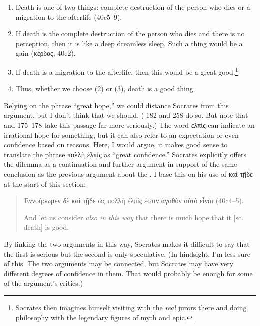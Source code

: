 \documentclass[11pt]{article}
\begin{document}
\begin{enumerate}

    \item Death is one of two things: complete destruction of the person who dies or a migration to the afterlife (40c5--9).

    \item If death is the complete destruction of the person who dies and there is no perception, then it is like a deep dreamless sleep.  Such a thing would be a gain ({\g κέρδος}, 40e2).

    \item If death is a migration to the afterlife, then this would be a great good.\footnote{Socrates then imagines himself visiting with the \emph{real} jurors there and doing philosophy with the legendary figures of myth and epic.}

    \item Thus, whether we choose (2) or (3), death is a good thing.

\end{enumerate}

Relying on the phrase ``great hope,'' we could distance Socrates from this argument, but I don't think that we should. (\citet{reeve1989} 182 and \citet{brickhousesmith1989} 258 do so.  But note that \citet{brickhousesmith1994} and \citet{brickhousesmith2004} 175--178 take this passage far more seriously.)  The word ἐλπίς can indicate an irrational hope for something, but it can also refer to an expectation or even confidence based on reasons.  Here, I would argue, it makes good sense to translate the phrase πολλὴ ἐλπίς as ``great confidence.''  Socrates explicitly offers the dilemma as a continuation and further argument in support of the same conclusion as the previous argument about the .  I base this on his use of {\g καὶ τῇδε} at the start of this section:
\begin{quote}
    {\g
    Ἐννοήσωμεν δὲ καὶ τῇδε ὡς πολλὴ ἐλπίς ἐστιν ἀγαθὸν αὐτὸ εἶναι
    } (40c4--5).

    And let us consider \emph{also in this way} that there is much hope that it [sc. death] is good.
\end{quote}
By linking the two arguments in this way, Socrates makes it difficult to say that the first is serious but the second is only speculative.  (In hindsight, I'm less sure of this.  The two arguments may be connected, but Socrates may have very different degrees of confidence in them.  That would probably be enough for some of the argument's critics.)
\end{document}

